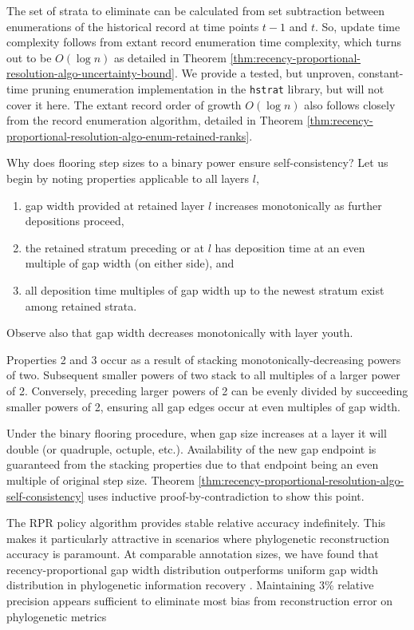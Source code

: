 The set of strata to eliminate can be calculated from set subtraction between enumerations of the historical record at time points $t-1$ and $t$.
So, update time complexity follows from extant record enumeration time complexity, which turns out to be $O(\log n)$ as detailed in Theorem \ref{thm:recency-proportional-resolution-algo-uncertainty-bound}.
We provide a tested, but unproven, constant-time pruning enumeration implementation in the \texttt{hstrat} library, but will not cover it here.
The extant record order of growth $O(\log n)$ also follows closely from the record enumeration algorithm, detailed in Theorem \ref{thm:recency-proportional-resolution-algo-enum-retained-ranks}.

Why does flooring step sizes to a binary power ensure self-consistency?
Let us begin by noting properties applicable to all layers $l$,
\begin{enumerate}
\item gap width provided at retained layer $l$ increases monotonically as further depositions proceed,
\item the retained stratum preceding or at $l$ has deposition time at an even multiple of gap width (on either side), and
\item all deposition time multiples of gap width up to the newest stratum exist among retained strata.
\end{enumerate}
Observe also that gap width decreases monotonically with layer youth.

Properties 2 and 3 occur as a result of stacking monotonically-decreasing powers of two.
Subsequent smaller powers of two stack to all multiples of a larger power of 2.
Conversely, preceding larger powers of 2 can be evenly divided by succeeding smaller powers of 2, ensuring all gap edges occur at even multiples of gap width.

Under the binary flooring procedure, when gap size increases at a layer it will double (or quadruple, octuple, etc.).
Availability of the new gap endpoint is guaranteed from the stacking properties due to that endpoint being an even multiple of original step size.
Theorem \ref{thm:recency-proportional-resolution-algo-self-consistency} uses inductive proof-by-contradiction to show this point.

The RPR policy algorithm provides stable relative accuracy indefinitely.
This makes it particularly attractive in scenarios where phylogenetic reconstruction accuracy is paramount.
At comparable annotation sizes, we have found that recency-proportional gap width distribution outperforms uniform gap width distribution in phylogenetic information recovery \citep{moreno2022hereditary}.
Maintaining 3\% relative precision appears sufficient to eliminate most bias from reconstruction error on phylogenetic metrics \citep{moreno2023toward}

